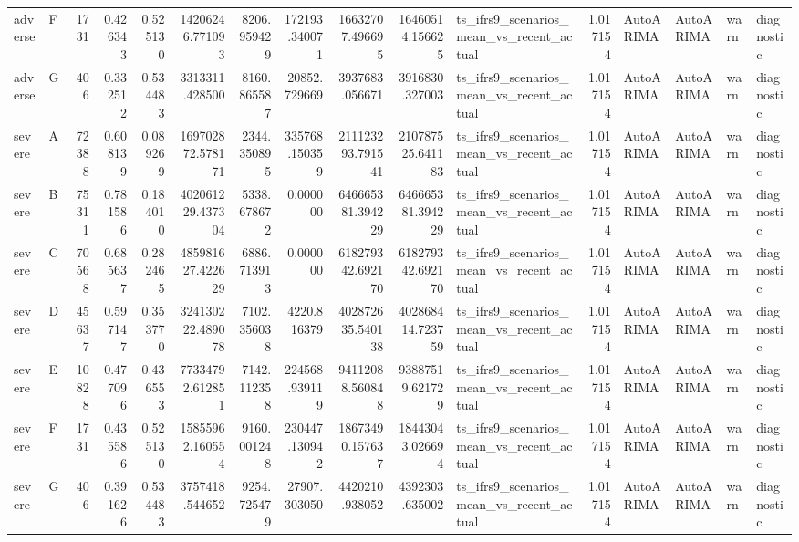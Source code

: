 \begin{tabular}{llrrrrrrrrlrllll}
adverse & F & 1731 & 0.426343 & 0.525130 & 14206246.771093 & 8206.959429 & 172193.340071 & 16632707.496695 & 16460514.156625 & ts_ifrs9_scenarios_mean_vs_recent_actual & 1.017154 & AutoARIMA & AutoARIMA & warn & diagnostic \\
adverse & G & 406 & 0.332512 & 0.534483 & 3313311.428500 & 8160.865587 & 20852.729669 & 3937683.056671 & 3916830.327003 & ts_ifrs9_scenarios_mean_vs_recent_actual & 1.017154 & AutoARIMA & AutoARIMA & warn & diagnostic \\
severe & A & 72388 & 0.608139 & 0.089269 & 169702872.578171 & 2344.350895 & 335768.150359 & 211123293.791541 & 210787525.641183 & ts_ifrs9_scenarios_mean_vs_recent_actual & 1.017154 & AutoARIMA & AutoARIMA & warn & diagnostic \\
severe & B & 75311 & 0.781586 & 0.184010 & 402061229.437304 & 5338.678672 & 0.000000 & 646665381.394229 & 646665381.394229 & ts_ifrs9_scenarios_mean_vs_recent_actual & 1.017154 & AutoARIMA & AutoARIMA & warn & diagnostic \\
severe & C & 70568 & 0.685637 & 0.282465 & 485981627.422629 & 6886.713913 & 0.000000 & 618279342.692170 & 618279342.692170 & ts_ifrs9_scenarios_mean_vs_recent_actual & 1.017154 & AutoARIMA & AutoARIMA & warn & diagnostic \\
severe & D & 45637 & 0.597147 & 0.353770 & 324130222.489078 & 7102.356038 & 4220.816379 & 402872635.540138 & 402868414.723759 & ts_ifrs9_scenarios_mean_vs_recent_actual & 1.017154 & AutoARIMA & AutoARIMA & warn & diagnostic \\
severe & E & 10828 & 0.477096 & 0.436553 & 77334792.612851 & 7142.112358 & 224568.939119 & 94112088.560848 & 93887519.621729 & ts_ifrs9_scenarios_mean_vs_recent_actual & 1.017154 & AutoARIMA & AutoARIMA & warn & diagnostic \\
severe & F & 1731 & 0.435586 & 0.525130 & 15855962.160554 & 9160.001248 & 230447.130942 & 18673490.157637 & 18443043.026694 & ts_ifrs9_scenarios_mean_vs_recent_actual & 1.017154 & AutoARIMA & AutoARIMA & warn & diagnostic \\
severe & G & 406 & 0.391626 & 0.534483 & 3757418.544652 & 9254.725479 & 27907.303050 & 4420210.938052 & 4392303.635002 & ts_ifrs9_scenarios_mean_vs_recent_actual & 1.017154 & AutoARIMA & AutoARIMA & warn & diagnostic \\
\bottomrule
\end{tabular}
